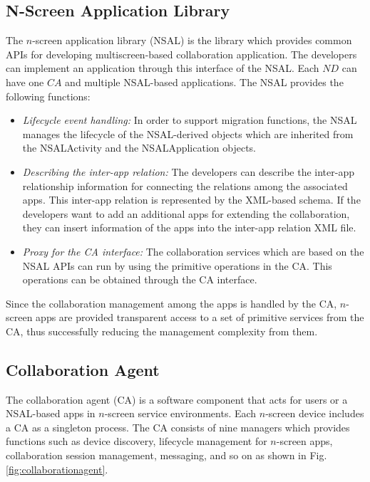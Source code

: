 \documentclass[conference]{IEEEtran}
\newcommand{\bi}{\begin{itemize}}
\newcommand{\ei}{\end{itemize}}
\newcommand{\ii}{\item}
\begin{document}
\subsection{N-Screen Application Library}
The $n$-screen application library (NSAL) is the library which provides common APIs for developing multiscreen-based collaboration application. The developers can implement an application through this interface of the NSAL. Each $ND$ can have one $CA$ and multiple NSAL-based applications. The NSAL provides the following functions:
\bi
\ii \textit{Lifecycle event handling: } In order to support migration functions, the NSAL manages the lifecycle of the NSAL-derived objects which are inherited from the {\small \sffamily NSALActivity} and the {\small \sffamily NSALApplication} objects. 
\ii \textit{Describing the inter-app relation:} The developers can describe the inter-app relationship information for connecting the relations among the associated apps. This inter-app relation is represented by the XML-based schema. If the developers want to add an additional apps for extending the collaboration, they can insert information of the apps into the inter-app relation XML file.
\ii \textit{Proxy for the CA interface: } The collaboration services which are based on the NSAL APIs can run by using the primitive operations in the CA. This operations can be obtained through the CA interface. 
\ei 
Since the collaboration management among the apps is handled by the CA, 
$n$-screen apps are provided transparent access to a set of primitive services from the CA, thus successfully reducing the management complexity from them.

\subsection{Collaboration Agent}
The collaboration agent (CA) is a software component that acts for users or a NSAL-based apps in $n$-screen service environments.  
Each $n$-screen device includes a CA as a singleton process.
The CA consists of nine managers which provides functions such as device discovery, lifecycle management for $n$-screen apps, collaboration session management, messaging, and so on as shown in Fig. \ref{fig:collaborationagent}. 
\end{document}
